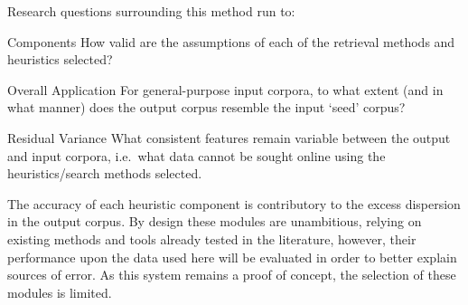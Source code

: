 Research questions surrounding this method run to:

\begin{itemizeTitle}

    \item[Components] How valid are the assumptions of each of the retrieval methods and heuristics selected?

    \item[Overall Application] For general-purpose input corpora, to what extent (and in what manner) does the output corpus resemble the input `seed' corpus?


    \item[Residual Variance] What consistent features remain variable between the output and input corpora, i.e.\ what data cannot be sought online using the heuristics/search methods selected.

\end{itemizeTitle}

The accuracy of each heuristic component is contributory to the excess dispersion in the output corpus.  By design these modules are unambitious, relying on existing methods and tools already tested in the literature, however, their performance upon the data used here will be evaluated in order to better explain sources of error.  As this system remains a proof of concept, the selection of these modules is limited.

